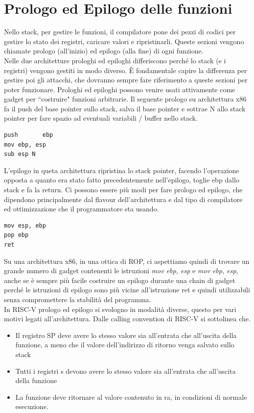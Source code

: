 \section*{Prologo ed Epilogo delle funzioni}
Nello stack, per gestire le funzioni, il compilatore pone dei pezzi di codici per gestire lo stato dei registri, caricare valori e ripristinarli. Queste sezioni vengono chiamate prologo (all'inizio) ed epilogo (alla fine) di ogni funzione.\\
Nelle due architetture prologhi ed epiloghi differiscono perché lo stack (e i registri) vengono gestiti in modo diverso. È fondamentale capire la differenza per gestire poi gli attacchi, che dovranno sempre fare riferimento a queste sezioni per poter funzionare. Prologhi ed epiloghi possono venire usati attivamente come gadget per ``costruire" funzioni arbitrarie. Il seguente prologo su architettura x86 fa il push del base pointer sullo stack, salva il base pointer e sottrae N allo stack pointer per fare spazio ad eventuali variabili / buffer nello stack.
\begin{verbatim}
push       ebp
mov	ebp, esp
sub	esp N 
\end{verbatim}
L'epilogo in queta architettura ripristina lo stack pointer, facendo l'operazione opposta a quanto era stato fatto precedentemente nell'epilogo, toglie ebp dallo stack e fa la return. Ci possono essere più modi per fare prologo ed epilogo, che dipendono principalmente dal flavour dell'architettura e dal tipo di compilatore ed ottimizzazione che il programmatore sta usando.
\begin{verbatim}
mov	esp, ebp
pop	ebp
ret
\end{verbatim}
Su una architettura x86, in una ottica di ROP, ci aspettiamo quindi di trovare un grande numero di gadget contenenti le istruzioni \textit{mov ebp, esp} e \textit{mov ebp, esp}, anche se è sempre più facile costruire un epilogo durante una chain di gadget perché le istruzioni di epilogo sono più vicine all'istruzione ret e quindi utilizzabili senza compromettere la stabilità del programma.\\
\newline
In RISC-V prologo ed epilogo si svologno in modalità diverse, questo per vari motivi legati all'architettura. Dalle calling convention di RISC-V \cite{Arrvindh} si sottolinea che.
\begin{itemize}
    \item Il registro SP deve avere lo stesso valore sia all'entrata che all'uscita della funzione, a meno che il valore dell'indirizzo di ritorno venga salvato sullo stack
    \item Tutti i registri s devono avere lo stesso valore sia all'entrata che all'uscita della funzione
    \item La funzione deve ritornare al valore contenuto in ra, in condizioni di normale esecuzione.
\end{itemize}
